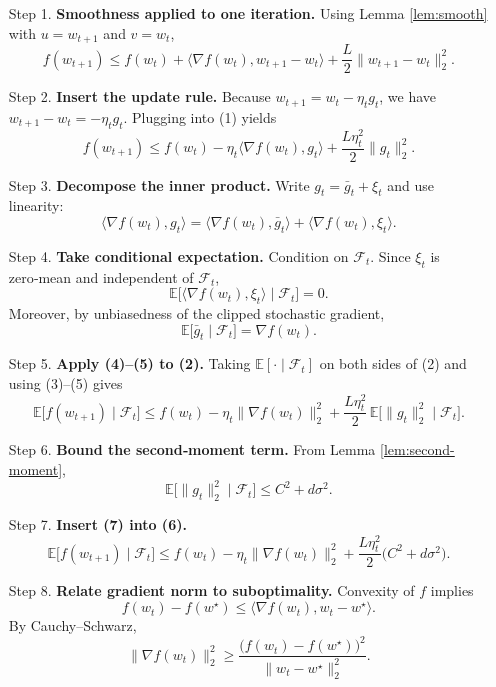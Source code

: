 \documentclass{article}
\begin{document}
\begin{enumerate}
\item[Step 1.] \textbf{Smoothness applied to one iteration.}  
Using Lemma \ref{lem:smooth} with $u=w_{t+1}$ and $v=w_t$,
\[
f(w_{t+1})\le f(w_t)+\langle\nabla f(w_t),w_{t+1}-w_t\rangle+\frac{L}{2}\|w_{t+1}-w_t\|_2^{2}.
\tag{1}
\]

\item[Step 2.] \textbf{Insert the update rule.}  
Because $w_{t+1}=w_t-\eta_t g_t$, we have $w_{t+1}-w_t=-\eta_t g_t$. Plugging into (1) yields
\[
f(w_{t+1})\le f(w_t)-\eta_t\langle\nabla f(w_t),g_t\rangle+\frac{L\eta_t^{2}}{2}\|g_t\|_2^{2}.
\tag{2}
\]

\item[Step 3.] \textbf{Decompose the inner product.}  
Write $g_t=\bar g_t+\xi_t$ and use linearity:
\[
\langle\nabla f(w_t),g_t\rangle
 =\langle\nabla f(w_t),\bar g_t\rangle+\langle\nabla f(w_t),\xi_t\rangle.
\tag{3}
\]

\item[Step 4.] \textbf{Take conditional expectation.}  
Condition on $\mathcal{F}_t$. Since $\xi_t$ is zero‑mean and independent of $\mathcal{F}_t$,
\[
\mathbb{E}\bigl[\langle\nabla f(w_t),\xi_t\rangle\mid\mathcal{F}_t\bigr]=0.
\tag{4}
\]
Moreover, by unbiasedness of the clipped stochastic gradient,
\[
\mathbb{E}\bigl[\bar g_t\mid\mathcal{F}_t\bigr]=\nabla f(w_t).
\tag{5}
\]

\item[Step 5.] \textbf{Apply (4)–(5) to (2).}  
Taking $\mathbb{E}[\cdot\mid\mathcal{F}_t]$ on both sides of (2) and using (3)–(5) gives
\[
\mathbb{E}\bigl[f(w_{t+1})\mid\mathcal{F}_t\bigr]
\le f(w_t)-\eta_t\|\nabla f(w_t)\|_2^{2}
+\frac{L\eta_t^{2}}{2}\,\mathbb{E}\bigl[\|g_t\|_2^{2}\mid\mathcal{F}_t\bigr].
\tag{6}
\]

\item[Step 6.] \textbf{Bound the second‑moment term.}  
From Lemma \ref{lem:second-moment},
\[
\mathbb{E}\bigl[\|g_t\|_2^{2}\mid\mathcal{F}_t\bigr]\le C^{2}+d\sigma^{2}.
\tag{7}
\]

\item[Step 7.] \textbf{Insert (7) into (6).}
\[
\mathbb{E}\bigl[f(w_{t+1})\mid\mathcal{F}_t\bigr]
\le f(w_t)-\eta_t\|\nabla f(w_t)\|_2^{2}
+\frac{L\eta_t^{2}}{2}\bigl(C^{2}+d\sigma^{2}\bigr).
\tag{8}
\]

\item[Step 8.] \textbf{Relate gradient norm to suboptimality.}  
Convexity of $f$ implies
\[
f(w_t)-f(w^{\star})\le\langle\nabla f(w_t),w_t-w^{\star}\rangle.
\tag{9}
\]
By Cauchy–Schwarz,
\[
\|\nabla f(w_t)\|_2^{2}
\ge \frac{\bigl(f(w_t)-f(w^{\star})\bigr)^{2}}{\|w_t-w^{\star}\|_2^{2}}.
\tag{10}
\]


\end{enumerate}
\end{document}
